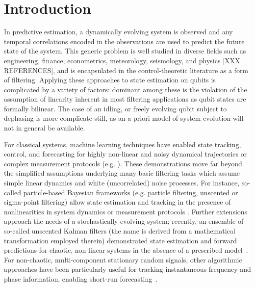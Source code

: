 \section{Introduction} 

In predictive estimation, a dynamically evolving system is observed and any temporal correlations encoded in the observations are used to predict the future state of the system.  This generic problem is well studied in diverse fields such as engineering, finance, econometrics, meteorology, seismology, and physics [XXX REFERENCES], and is encapsulated in the control-theoretic literature as a form of filtering.  Applying these approaches to state estimation on qubits is complicated by a variety of factors: dominant among these is the violation of the assumption of linearity inherent in most filtering applications as qubit states are formally bilinear. The case of an idling, or freely evolving qubit subject to dephasing is more complicate still, as an a priori model of system evolution will not in general be available.

For classical systems, machine learning techniques have enabled state tracking, control, and forecasting for highly non-linear and noisy dynamical trajectories or complex measurement protocols (e.g. \cite{garcia2016optimal, bach2004learning, tatinati2013hybrid, hall2011reinforcement, hamilton2016ensemble}). These demonstrations move far beyond the simplified assumptions underlying many basic filtering tasks which assume simple linear dynamics and white (uncorrelated) noise processes. For instance, so-called particle-based Bayesian frameworks (e.g. particle filtering, unscented or sigma-point filtering) allow state estimation and tracking in the presence of nonlinearities in system dynamics or measurement protocols \cite{candy2016bayesian}.  Further extensions approach the needs of a stochastically evolving system; recently, an ensemble of so-called unscented Kalman filters (the name is derived from a mathematical transformation employed therein) demonstrated state estimation and forward predictions for chaotic, non-linear systems in the absence of a prescribed model~\cite{hamilton2016ensemble}. For non-chaotic, multi-component stationary random signals, other algorithmic approaches have been particularly useful for tracking instantaneous frequency and phase information, enabling short-run forecasting~\cite{boashash1992estimating2, ji2016gradient}.  

